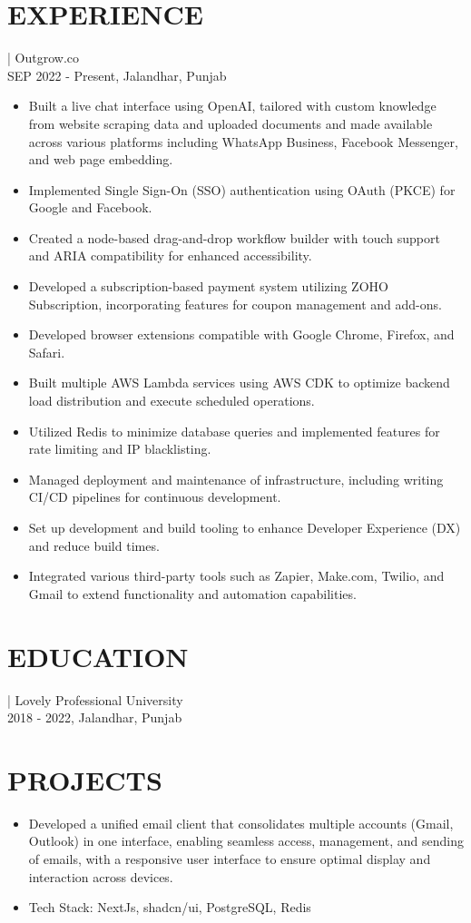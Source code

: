 \documentclass[]{resume}
\begin{document}
\section{EXPERIENCE}
 | \textrm{Outgrow.co}\\
SEP 2022 - Present, Jalandhar, Punjab
\begin{itemize}
  \item Built a live chat interface using OpenAI, tailored with custom knowledge from website scraping data and uploaded documents and made available across various platforms including WhatsApp Business, Facebook Messenger, and web page embedding.
  \item Implemented Single Sign-On (SSO) authentication using OAuth (PKCE) for Google and Facebook.
  \item Created a node-based drag-and-drop workflow builder with touch support and ARIA compatibility for enhanced accessibility.
  \item Developed a subscription-based payment system utilizing ZOHO Subscription, incorporating features for coupon management and add-ons.
  \item Developed browser extensions compatible with Google Chrome, Firefox, and Safari.
  \item Built multiple AWS Lambda services using AWS CDK to optimize backend load distribution and execute scheduled operations.
  \item Utilized Redis to minimize database queries and implemented features for rate limiting and IP blacklisting.
  \item Managed deployment and maintenance of infrastructure, including writing CI/CD pipelines for continuous development.
  \item Set up development and build tooling to enhance Developer Experience (DX) and reduce build times.
  \item Integrated various third-party tools such as Zapier, Make.com, Twilio, and Gmail to extend functionality and automation capabilities.
\end{itemize}

\section{EDUCATION}
 | \textrm{Lovely Professional University}\\
2018 - 2022, Jalandhar, Punjab

\section{PROJECTS}
\begin{itemize}
  \item Developed a unified email client that consolidates multiple accounts (Gmail, Outlook) in one interface, enabling seamless access, management, and sending of emails, with a responsive user interface to ensure optimal display and interaction across devices.
  \item Tech Stack: NextJs, shadcn/ui, PostgreSQL, Redis
\end{itemize}
\end{document}
